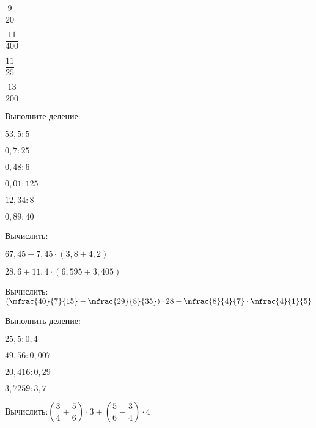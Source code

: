 \begin{class}[number=5]
\begin{listofex}[resume]
\begin{enumcols}[itemcolumns=6]
			\item \( \dfrac{9}{20} \)
			\item \( \dfrac{11}{400} \)
			\item \( \dfrac{11}{25} \)
			\item \( \dfrac{13}{200} \)
		\end{enumcols}
		\item Выполните деление:
		\begin{enumcols}[itemcolumns=6]
			\item \( 53,5:5 \)
			\item \( 0,7:25 \)
			\item \( 0,48:6 \)
			\item \( 0,01:125 \)
			\item \( 12,34:8 \)
			\item \( 0,89:40 \)
		\end{enumcols}
	\end{listofex}
\end{class}
%
%
\begin{class}[number=6]
	\begin{listofex}
		\item Вычислить:
		\begin{enumcols}[itemcolumns=2]
			\item \( 67,45-7,45\cdot(3,8+4,2) \)
			\item \( 28,6+11,4\cdot(6,595+3,405) \)
		\end{enumcols}
		\item Вычислить:\quad\( \left( \mfrac{40}{7}{15}-\mfrac{29}{8}{35} \right)\cdot28-\mfrac{8}{4}{7}\cdot\mfrac{4}{1}{5} \)
		\item Выполнить деление:
		\begin{enumcols}[itemcolumns=4]
			\item \( 25,5:0,4 \)
			\item \( 49,56:0,007 \)
			\item \( 20,416:0,29 \)
			\item \( 3,7259:3,7 \)
		\end{enumcols}
	\end{listofex}
\end{class}
%
%
\begin{homework}[number=3]
	\begin{listofex}
		\item Вычислить:\quad\( \left( \dfrac{3}{4}+\dfrac{5}{6} \right)\cdot3+\left( \dfrac{5}{6}-\dfrac{3}{4} \right)\cdot4 \)
	\end{listofex}
\end{homework}
